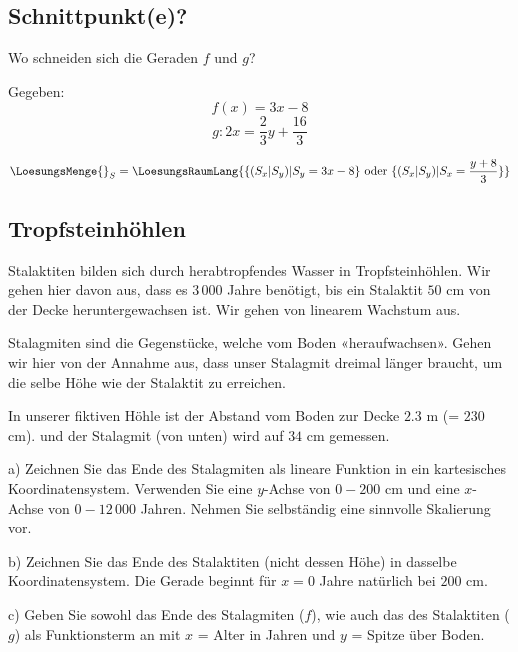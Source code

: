 \subsection{Schnittpunkt(e)?}
Wo schneiden sich die Geraden $f$ und $g$?

Gegeben:
$$f(x) = 3x - 8$$
$$g: 2x=\frac23y+\frac{16}3$$

\vspace{5mm}
$$\LoesungsMenge{}_S=\LoesungsRaumLang{\{ (S_x|S_y) | S_y = 3x-8  \} \text{ oder } \{ (S_x|S_y) | S_x = \frac{y+8}3  \}}$$
\subsection{Tropfsteinhöhlen}

Stalaktiten bilden sich durch herabtropfendes Wasser in Tropfsteinhöhlen.
Wir gehen hier davon aus, dass es $3\,000$ Jahre benötigt, bis ein
Stalaktit $50$ cm von der Decke heruntergewachsen ist. Wir gehen von
linearem Wachstum aus.

Stalagmiten sind die Gegenstücke, welche vom Boden
«heraufwachsen». Gehen wir hier von der Annahme aus, dass unser
Stalagmit dreimal länger braucht, um die selbe Höhe wie der Stalaktit zu erreichen.

In unserer fiktiven Höhle ist der Abstand vom Boden zur Decke $2.3$ m
(= $230$ cm). und der Stalagmit (von unten) wird auf $34$ cm gemessen.

a) Zeichnen Sie das Ende des Stalagmiten als
lineare Funktion in ein kartesisches Koordinatensystem. Verwenden Sie
eine $y$-Achse von $0 - 200$ cm und eine $x$-Achse von $0-12\,000$
Jahren. Nehmen Sie selbständig eine sinnvolle Skalierung vor.


b) Zeichnen Sie das Ende des Stalaktiten (nicht dessen Höhe) in
dasselbe Koordinatensystem. Die Gerade beginnt für $x=0$ Jahre
natürlich bei $200$ cm.
\newpage

c) Geben Sie sowohl das Ende des Stalagmiten ($f$), wie auch das des
Stalaktiten ($g$) als Funktionsterm an mit $x$ = Alter in Jahren und
$y$ = Spitze über Boden.



